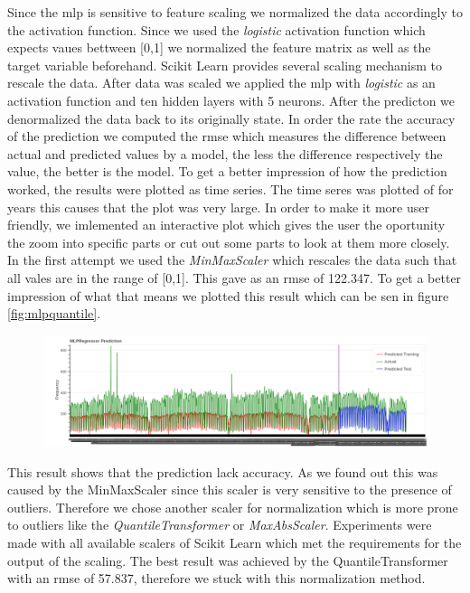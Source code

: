 Since the \acs{mlp} is sensitive to feature scaling we normalized the data accordingly to the activation function. Since we used the \emph{logistic} activation function which expects vaues bettween [0,1] we normalized the feature matrix as well as the target variable beforehand. Scikit Learn provides several scaling mechanism to rescale the data. 
After data was scaled we applied the \acs{mlp} with \emph{logistic} as an activation function and ten hidden layers with 5 neurons. After the predicton we denormalized the data back to its originally state. In order  the rate the accuracy of the prediction we computed the \acf{rmse} which measures the difference between actual and predicted values by a model, the less the difference respectively the value, the better is the model.
To get a better impression of how the prediction worked, the results were plotted as time series.
The time seres was plotted of for years this causes that the plot was very large. In order to make it more user friendly, we imlemented an interactive plot which gives the user the oportunity the zoom into specific parts or cut out some parts to look at them more closely.\\
In the first attempt we used the \emph{MinMaxScaler} which rescales the data such that all vales are in the range of [0,1].
This gave as an \acs{rmse} of 122.347. To get a better impression of what that means we plotted this result which can be sen in figure \ref{fig:mlpquantile}.
\begin{figure}[H]
\hspace{-2.8cm}
\includegraphics[width=1.4\textwidth]{img/mlpminmax}\label{fig:mlpminmax}
\label{fig:mlpminmax}
\end{figure}
This result shows that the prediction lack accuracy. As we found out this was caused by the MinMaxScaler since this scaler is very sensitive to the presence of outliers. Therefore we chose another scaler for normalization which is more prone to outliers like the \emph{QuantileTransformer} or \emph{MaxAbsScaler}. Experiments were made with all available scalers of Scikit Learn which met the requirements for the output of the scaling. The best result was achieved by the QuantileTransformer with an \acs{rmse} of 57.837, therefore we stuck with this normalization method.\\
